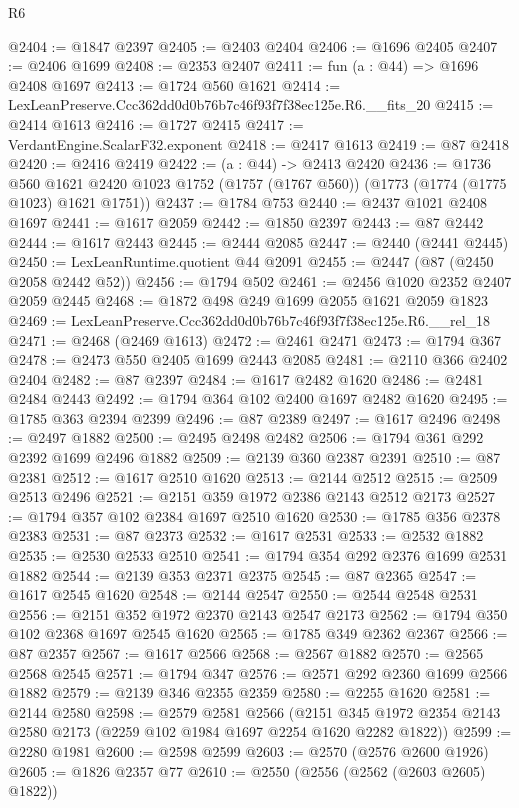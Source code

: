 \begin{lexlean}{R6}
\begin{coremodule}
@2404 := @1847 @2397
@2405 := @2403 @2404
@2406 := @1696 @2405
@2407 := @2406 @1699
@2408 := @2353 @2407
@2411 := fun (a : @44) => @1696 @2408 @1697
@2413 := @1724 @560 @1621
@2414 := LexLeanPreserve.Ccc362dd0d0b76b7c46f93f7f38ec125e.R6.__fits_20
@2415 := @2414 @1613
@2416 := @1727 @2415
@2417 := VerdantEngine.ScalarF32.exponent
@2418 := @2417 @1613
@2419 := @87 @2418
@2420 := @2416 @2419
@2422 := (a : @44) -> @2413 @2420
@2436 := @1736
    @560
    @1621
    @2420
    @1023
    @1752
    (@1757 (@1767 @560))
    (@1773 (@1774 (@1775 @1023) @1621 @1751))
@2437 := @1784 @753
@2440 := @2437 @1021 @2408 @1697
@2441 := @1617 @2059
@2442 := @1850 @2397
@2443 := @87 @2442
@2444 := @1617 @2443
@2445 := @2444 @2085
@2447 := @2440 (@2441 @2445)
@2450 := LexLeanRuntime.quotient @44 @2091
@2455 := @2447 (@87 (@2450 @2058 @2442 @52))
@2456 := @1794 @502
@2461 := @2456 @1020 @2352 @2407 @2059 @2445
@2468 := @1872 @498 @249 @1699 @2055 @1621 @2059 @1823
@2469 := LexLeanPreserve.Ccc362dd0d0b76b7c46f93f7f38ec125e.R6.__rel_18
@2471 := @2468 (@2469 @1613)
@2472 := @2461 @2471
@2473 := @1794 @367
@2478 := @2473 @550 @2405 @1699 @2443 @2085
@2481 := @2110 @366 @2402 @2404
@2482 := @87 @2397
@2484 := @1617 @2482 @1620
@2486 := @2481 @2484 @2443
@2492 := @1794 @364 @102 @2400 @1697 @2482 @1620
@2495 := @1785 @363 @2394 @2399
@2496 := @87 @2389
@2497 := @1617 @2496
@2498 := @2497 @1882
@2500 := @2495 @2498 @2482
@2506 := @1794 @361 @292 @2392 @1699 @2496 @1882
@2509 := @2139 @360 @2387 @2391
@2510 := @87 @2381
@2512 := @1617 @2510 @1620
@2513 := @2144 @2512
@2515 := @2509 @2513 @2496
@2521 := @2151 @359 @1972 @2386 @2143 @2512 @2173
@2527 := @1794 @357 @102 @2384 @1697 @2510 @1620
@2530 := @1785 @356 @2378 @2383
@2531 := @87 @2373
@2532 := @1617 @2531
@2533 := @2532 @1882
@2535 := @2530 @2533 @2510
@2541 := @1794 @354 @292 @2376 @1699 @2531 @1882
@2544 := @2139 @353 @2371 @2375
@2545 := @87 @2365
@2547 := @1617 @2545 @1620
@2548 := @2144 @2547
@2550 := @2544 @2548 @2531
@2556 := @2151 @352 @1972 @2370 @2143 @2547 @2173
@2562 := @1794 @350 @102 @2368 @1697 @2545 @1620
@2565 := @1785 @349 @2362 @2367
@2566 := @87 @2357
@2567 := @1617 @2566
@2568 := @2567 @1882
@2570 := @2565 @2568 @2545
@2571 := @1794 @347
@2576 := @2571 @292 @2360 @1699 @2566 @1882
@2579 := @2139 @346 @2355 @2359
@2580 := @2255 @1620
@2581 := @2144 @2580
@2598 := @2579
    @2581
    @2566
    (@2151 @345 @1972 @2354 @2143 @2580 @2173 (@2259 @102 @1984 @1697 @2254 @1620 @2282 @1822))
@2599 := @2280 @1981
@2600 := @2598 @2599
@2603 := @2570 (@2576 @2600 @1926)
@2605 := @1826 @2357 @77
@2610 := @2550 (@2556 (@2562 (@2603 @2605) @1822))

\end{coremodule}
\end{lexlean}
